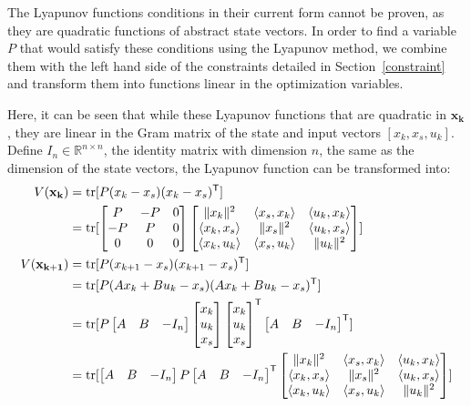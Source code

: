The Lyapunov functions conditions in their current form cannot be proven, as they are quadratic functions of abstract state vectors. In order to find a variable $P$ that would satisfy these conditions using the Lyapunov method, we combine them with the left hand side of the constraints detailed in Section~\ref{constraint} and transform them into functions linear in the optimization variables.

Here, it can be seen that while these Lyapunov functions that are quadratic in $\mathbf{x_k}$, they are linear in the Gram matrix of the state and input vectors $[x_k, x_s, u_k]$. Define $I_n \in \mathbb{R}^{n \times n}$, the identity matrix with dimension $n$, the same as the dimension of the state vectors, the Lyapunov function can be transformed into:
\begin{subequations}  \label{eqn:Vx}
	\begin{align}
		V(\mathbf{x_k}) &= \operatorname{\mathrm{tr}}[P(x_k - x_s)(x_k - x_s)^{\mathsf{T}}]\\
					  &= \operatorname{\mathrm{tr}}[\begin{bmatrix}P &-P &0\\-P & P & 0\\0 & 0 & 0\end{bmatrix}\begin{bmatrix}\|x_k\|^2 & \langle x_s, x_k \rangle & \langle u_k, x_k \rangle \\ \langle x_k, x_s \rangle & \|x_s\|^2 & \langle u_k, x_s \rangle \\ \langle x_k, u_k \rangle & \langle x_s, u_k \rangle & \|u_k\|^2\end{bmatrix}] \notag \\
		V(\mathbf{x_{k+1}}) &= \operatorname{\mathrm{tr}}[P(x_{k+1} - x_s)(x_{k+1} - x_s)^{\mathsf{T}}]\\
		&= \operatorname{\mathrm{tr}}[P(Ax_k + Bu_k - x_s)(Ax_k + Bu_k - x_s)^{\mathsf{T}}]\notag  \\
		&= \operatorname{\mathrm{tr}}[P\begin{bmatrix}A & B & -I_n\end{bmatrix}\begin{bmatrix}x_k \\ u_k \\ x_s\end{bmatrix}\begin{bmatrix}x_k \\ u_k \\ x_s\end{bmatrix}^{\mathsf{T}}\begin{bmatrix}A & B & -I_n\end{bmatrix}^{\mathsf{T}}]\notag \\
		&= \operatorname{\mathrm{tr}}[\begin{bmatrix}A & B & -I_n\end{bmatrix}P\begin{bmatrix}A & B & -I_n\end{bmatrix}^{\mathsf{T}}\begin{bmatrix}\|x_k\|^2 & \langle x_s, x_k \rangle & \langle u_k, x_k \rangle \\ \langle x_k, x_s \rangle & \|x_s\|^2 & \langle u_k, x_s \rangle \\ \langle x_k, u_k \rangle & \langle x_s, u_k \rangle & \|u_k\|^2\end{bmatrix}] \notag 
	\end{align}
\end{subequations}
